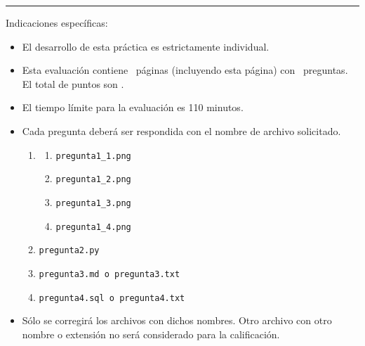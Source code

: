 \documentclass[12pt]{exam}
\newcommand{\timelimit}{110 minutos}
\begin{document}
\rule[2ex]{\textwidth}{2pt}
\Large Indicaciones específicas:
\normalsize
\begin{itemize}
  \item El desarrollo de esta práctica es estrictamente individual.
  \item Esta evaluación contiene \numpages\ páginas (incluyendo esta página) con \numquestions\ preguntas. El total de puntos son \numpoints.
  \item El tiempo límite para la evaluación es \timelimit.
  \item Cada pregunta deberá ser respondida con el nombre de archivo solicitado.
  \begin{enumerate}
    \item\begin{enumerate}
      \item \texttt{pregunta1\_1.png}
      \item \texttt{pregunta1\_2.png}
      \item \texttt{pregunta1\_3.png}
      \item \texttt{pregunta1\_4.png}
    \end{enumerate}
    
    \item \texttt{pregunta2.py}
    \item \texttt{pregunta3.md o pregunta3.txt}
    \item \texttt{pregunta4.sql o pregunta4.txt}
  
  \end{enumerate}

  \item Sólo se corregirá los archivos con dichos nombres. Otro archivo con otro nombre o extensión no será considerado para la calificación.
\end{itemize}


\end{document}
